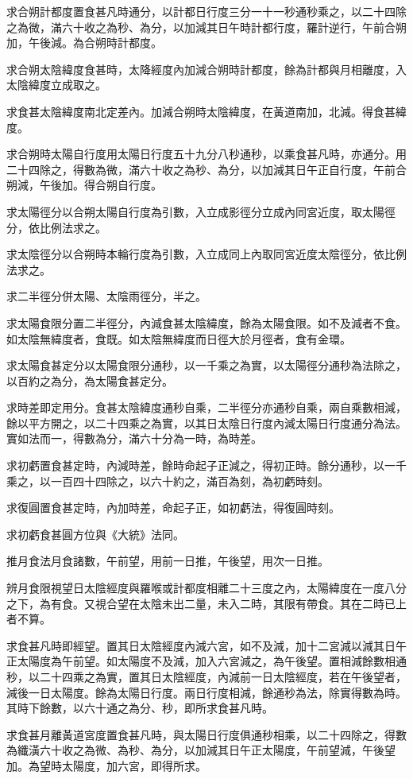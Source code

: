 求合朔計都度置食甚凡時通分，以計都日行度三分一十一秒通秒乘之，以二十四除之為微，滿六十收之為秒、為分，以加減其日午時計都行度，羅計逆行，午前合朔加，午後減。為合朔時計都度。

求合朔太陰緯度食甚時，太降經度內加減合朔時計都度，餘為計都與月相離度，入太陰緯度立成取之。

求食甚太陰緯度南北定差內。加減合朔時太陰緯度，在黃道南加，北減。得食甚緯度。

求合朔時太陽自行度用太陽日行度五十九分八秒通秒，以乘食甚凡時，亦通分。用二十四除之，得數為微，滿六十收之為秒、為分，以加減其日午正自行度，午前合朔減，午後加。得合朔自行度。

求太陽徑分以合朔太陽自行度為引數，入立成影徑分立成內同宮近度，取太陽徑分，依比例法求之。

求太陰徑分以合朔時本輪行度為引數，入立成同上內取同宮近度太陰徑分，依比例法求之。

求二半徑分併太陽、太陰雨徑分，半之。

求太陽食限分置二半徑分，內減食甚太陰緯度，餘為太陽食限。如不及減者不食。如太陰無緯度者，食既。如太陰無緯度而日徑大於月徑者，食有金環。

求太陽食甚定分以太陽食限分通秒，以一千乘之為實，以太陽徑分通秒為法除之，以百約之為分，為太陽食甚定分。

求時差即定用分。食甚太陰緯度通秒自乘，二半徑分亦通秒自乘，兩自乘數相減，餘以平方開之，以二十四乘之為實，以其日太陰日行度內減太陽日行度通分為法。實如法而一，得數為分，滿六十分為一時，為時差。

求初虧置食甚定時，內減時差，餘時命起子正減之，得初正時。餘分通秒，以一千乘之，以一百四十四除之，以六十約之，滿百為刻，為初虧時刻。

求復圓置食甚定時，內加時差，命起子正，如初虧法，得復圓時刻。

求初虧食甚圓方位與《大統》法同。

推月食法月食諸數，午前望，用前一日推，午後望，用次一日推。

辨月食限視望日太陰經度與羅喉或計都度相離二十三度之內，太陽緯度在一度八分之下，為有食。又視合望在太陰未出二量，未入二時，其限有帶食。其在二時已上者不算。

求食甚凡時即經望。置其日太陰經度內減六宮，如不及減，加十二宮減以減其日午正太陽度為午前望。如太陽度不及減，加入六宮減之，為午後望。置相減餘數相通秒，以二十四乘之為實，置其日太陰經度，內減前一日太陰經度，若在午後望者，減後一日太陽度。餘為太陽日行度。兩日行度相減，餘通秒為法，除實得數為時。其時下餘數，以六十通之為分、秒，即所求食甚凡時。

求食甚月離黃道宮度置食甚凡時，與太陽日行度俱通秒相乘，以二十四除之，得數為纖潢六十收之為微、為秒、為分，以加減其日午正太陽度，午前望減，午後望加。為望時太陽度，加六宮，即得所求。

